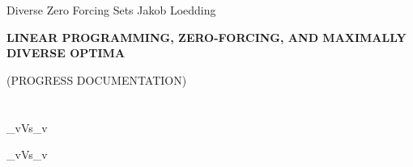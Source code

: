 \documentclass{article}
\begin{document}
\noindent
{Diverse Zero Forcing Sets}
\hfill
{
Jakob Loedding}

\vspace{.3 in}

\centerline{\large \bf  L{\small INEAR} P{\small ROGRAMMING,} Z{\small ERO-}F{\small ORCING,} {\small AND} M{\small AXIMALLY} D{\small IVERSE} O{\small PTIMA} }
\vspace{.1 in}
\centerline{\large  (P{\small ROGRESS} D{\small OCUMENTATION})}

\vspace{.2 in}

\section{}\label{sec:intro}

\begin{mini!}
	{}{\sum_{v\in V}s_{v}}{}{}\label{eq:zfip-obj}
	\label{eq:zfip-const1}
	\label{eq:zfip-const2}
	\label{eq:zfip-const3}
	\label{eq:zfip-const4}
\end{mini!}

\begin{mini!}
	{}{\sum_{v\in V}s_{v}}{}{}\label{eq:zfip-obj}
	\label{eq:zfip-const1}
	\label{eq:zfip-const2}
	\label{eq:zfip-const3}
	\label{eq:zfip-const4}
\end{mini!}
\end{document}
